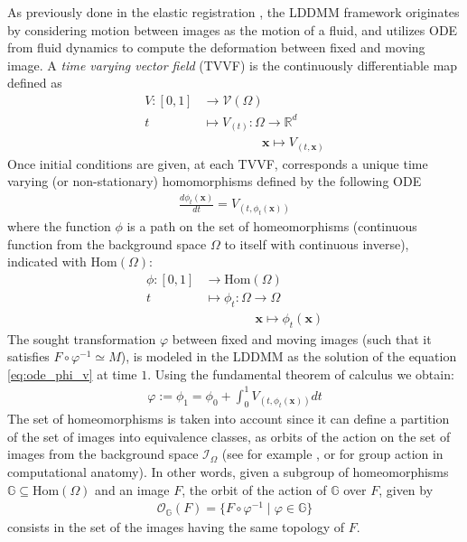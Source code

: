 As previously done in the elastic registration \cite{Broit:1981}, the LDDMM framework \cite{beg2005computing} originates by considering motion between images as the motion of a fluid, and utilizes ODE from fluid dynamics to compute the deformation between fixed and moving image. 
 A \emph{time varying vector field} (TVVF) is the continuously differentiable map defined as
 \begin{align*}
 	V:[0,1] & \longrightarrow  \mathcal{V}(\Omega)\\
 	t  &\longmapsto  V_{(t)}  : \Omega \longrightarrow   \mathbb{R}^{d} \\
 	& \qquad \quad \quad ~~~\mathbf{x} \longmapsto V_{(t,\mathbf{x} )}
 \end{align*}
 Once initial conditions are given, at each TVVF, corresponds a unique time varying (or non-stationary) homomorphisms defined  by the following ODE 
 \begin{align}\label{eq:ode_phi_v}
 	\frac{d\phi_{t} (\mathbf{x})}{dt} = V_{(t,\phi_{t} (\mathbf{x}) )}
 \end{align}
 where the function $\phi$ is a path on the set of homeomorphisms  (continuous function from the background space $\Omega$ to itself with continuous inverse), indicated with $\text{Hom}(\Omega)$:
 \begin{align*}
 	\phi : [0,1] & \longrightarrow  \text{Hom}(\Omega)\\
 	t  &\longmapsto \phi_{t}  : \Omega \longrightarrow    \Omega \\
 	& \qquad \quad \quad  \mathbf{x} \longmapsto \phi_{t}  (\mathbf{x} )
 \end{align*}
The sought transformation $\varphi$ between fixed and moving images (such that it satisfies $ F\circ \varphi^{-1} \simeq M $), is modeled in the LDDMM as the solution of the equation \ref{eq:ode_phi_v} at time $1$. Using the fundamental theorem of calculus we obtain:
 \begin{align*}
 	\varphi := \phi_{1} = \phi_{0} + \int_0^1 V_{(t,\phi_{t} (\mathbf{x}) )} dt
 \end{align*}
The set of homeomorphisms is taken into account since it can define a partition of the set of images into equivalence classes, as orbits of the action on the set of images from the background space $\mathcal{I}_{\Omega}$ (see for example \cite{artin2011algebra}, or \cite{trouve2005metamorphoses} for group action in computational anatomy). In other words, given a subgroup of homeomorphisms $\mathbb{G}\subseteq \text{Hom}(\Omega)$ and an image $F$, the orbit of the action of $\mathbb{G}$ over $F$, given by
\begin{align*}
\mathcal{O}_{\mathbb{G}}(F) = \{ F\circ \varphi^{-1} \mid \varphi \in \mathbb{G} \}
\end{align*}
consists in the set of the images having the same topology of $F$.\\

